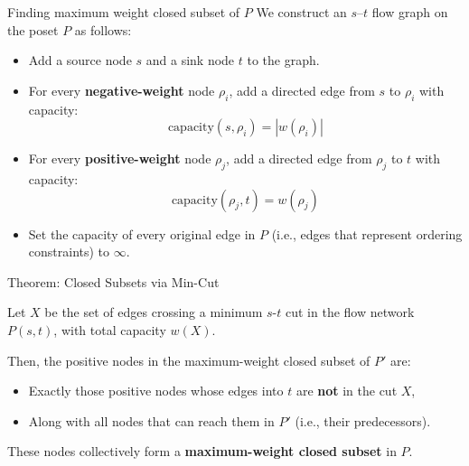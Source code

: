 \documentclass[aspectratio=169,xcolor=dvipsnames]{beamer}
\begin{document}
\begin{frame}{Finding maximum weight closed subset of $P$}
We construct an \( s \)--\( t \) flow graph on the poset \( P \) as follows:

\begin{itemize}
    \item Add a source node \( s \) and a sink node \( t \) to the graph.
    
    \item For every \textbf{negative-weight} node \( \rho_i \), add a directed edge from \( s \) to \( \rho_i \) with capacity:
    \[
    \text{capacity}(s, \rho_i) = |w(\rho_i)|
    \]
    
    \item For every \textbf{positive-weight} node \( \rho_j \), add a directed edge from \( \rho_j \) to \( t \) with capacity:
    \[
    \text{capacity}(\rho_j, t) = w(\rho_j)
    \]
    
    \item Set the capacity of every original edge in \( P \) (i.e., edges that represent ordering constraints) to \( \infty \).
\end{itemize}
\end{frame}

\begin{frame}{Theorem: Closed Subsets via Min-Cut}
\begin{theorem}
Let \( X \) be the set of edges crossing a minimum \( s \)-\( t \) cut in the flow network \( P(s, t) \), with total capacity \( w(X) \).

\medskip

Then, the positive nodes in the maximum-weight closed subset of \( P' \) are:
\begin{itemize}
  \item Exactly those positive nodes whose edges into \( t \) are \textbf{not} in the cut \( X \),
  \item Along with all nodes that can reach them in \( P' \) (i.e., their predecessors).
\end{itemize}

\medskip

These nodes collectively form a \textbf{maximum-weight closed subset} in \( P \).
\end{theorem}
\end{frame}
\end{document}
